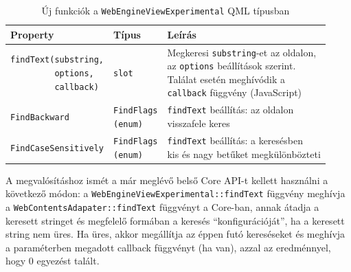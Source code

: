 \documentclass[12pt]{report}
\begin{document}
\begin{table}[h!]
    \centering
    \begin{tabular}[t]{ | l | l | p{188pt} | }
        \hline
        \textbf{Property} & \textbf{Típus} & \textbf{Leírás} \\ \hline

        \makecell[l]{\texttt{findText(substring,} \\
                     \texttt{~~~~~~~~~options,} \\
                     \texttt{~~~~~~~~~callback)}} & \texttt{slot} &
        \makecell[l]{Megkeresi \texttt{substring}-et az oldalon, \\
                     az \texttt{options} beállítások szerint. \\
                     Találat esetén meghívódik a \\
                     \texttt{callback} függvény (JavaScript)}
        \\ \hline

        \texttt{FindBackward} & \makecell[l]{\texttt{FindFlags} \\ \texttt{(enum)}} &
        \makecell[l]{\texttt{findText} beállítás: az oldalon \\
                     visszafele keres}
        \\ \hline

        \texttt{FindCaseSensitively} & \makecell[l]{\texttt{FindFlags} \\ \texttt{(enum)}} &
        \makecell[l]{\texttt{findText} beállítás: a keresésben \\
                     kis és nagy betűket megkülönbözteti}
        \\ \hline
    \end{tabular}
    \caption{
        \label{tab:find-text-api}
        Új funkciók a \texttt{WebEngineViewExperimental} QML típusban
    }
\end{table}

A megvalósításhoz ismét a már meglévő belső Core API-t kellett használni a következő módon:
a \texttt{WebEngineViewExperimental::findText} függvény meghívja
a \texttt{WebContentsAdapater::findText} függvényt a Core-ban,
annak átadja a keresett stringet és megfelelő formában a keresés ``konfigurációját'',
ha a keresett string nem üres.
Ha üres, akkor megállítja az éppen futó kereséseket és meghívja a paraméterben
megadott callback függvényt (ha van), azzal az eredménnyel, hogy 0 egyezést talált.
\end{document}

